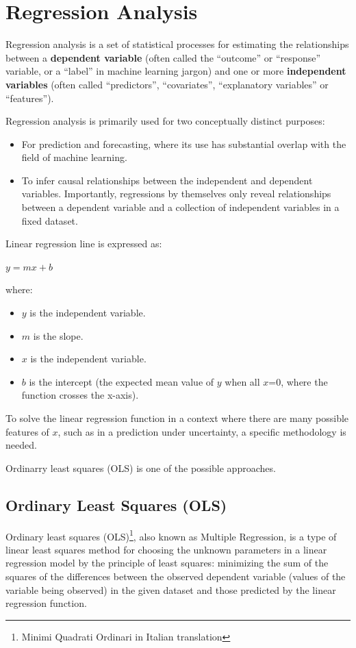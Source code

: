 \documentclass{article}
\begin{document}
\clearpage

\section{Regression Analysis}
Regression analysis is a set of statistical processes for estimating the relationships between a \textbf{dependent variable} (often called the “outcome” or “response” variable, or a “label” in machine learning jargon) and one or more \textbf{independent variables} (often called “predictors”, “covariates”, “explanatory variables” or “features”).

Regression analysis is primarily used for two conceptually distinct purposes:
\begin{itemize}
    \item For prediction and forecasting, where its use has substantial overlap with the field of machine learning.
    \item To infer causal relationships between the independent and dependent variables. Importantly, regressions by themselves only reveal relationships between a dependent variable and a collection of independent variables in a fixed dataset.
\end{itemize}

Linear regression line is expressed as:

$y = mx + b$

where:
\begin{itemize}
    \item $y$ is the independent variable.
    \item $m$ is the slope.
    \item $x$ is the independent variable.
    \item $b$ is the intercept (the expected mean value of $y$ when all $x$=0, where the function crosses the x-axis).
\end{itemize}

To solve the linear regression function in a context where there are many possible features of $x$, such as in a prediction under uncertainty, a specific methodology is needed. 

Ordinarry least squares (OLS) is one of the possible approaches.

\subsection{Ordinary Least Squares (OLS)}
Ordinary least squares (OLS)\footnote{Minimi Quadrati Ordinari in Italian translation}, also known as Multiple Regression, is a type of linear least squares method for choosing the unknown parameters in a linear regression model by the principle of least squares: minimizing the sum of the squares of the differences between the observed dependent variable (values of the variable being observed) in the given dataset and those predicted by the linear regression function.
\end{document}
